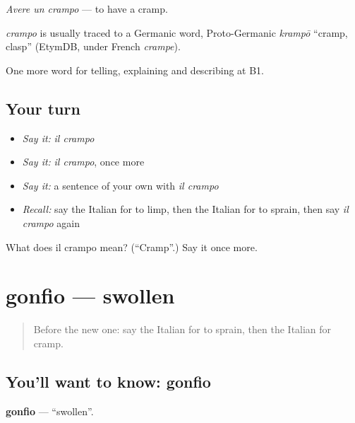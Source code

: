 \emph{Avere un crampo} — to have a cramp.

\begin{cousinweb}
\emph{crampo} is usually traced to a Germanic word, Proto-Germanic \emph{krampō} \textquotedblleft{}cramp, clasp\textquotedblright{} (EtymDB, under French \emph{crampe}).
\end{cousinweb}

\begin{grammarlens}[title={What you've built}]
One more word for telling, explaining and describing at B1.
\end{grammarlens}

\subsection*{Your turn}
\begin{itemize}
\raggedright
  \item \emph{Say it:} \emph{il crampo}
  \item \emph{Say it:} \emph{il crampo}, once more
  \item \emph{Say it:} a sentence of your own with \emph{il crampo}
  \item \emph{Recall:} say the Italian for to limp, then the Italian for to sprain, then say \emph{il crampo} again
\end{itemize}

\begin{tcolorbox}[breakable,colback=teal!4,colframe=teal!35!black,title={Before you move on}]
What does il crampo mean? (\textquotedblleft{}Cramp\textquotedblright{}.) Say it once more.
\end{tcolorbox}
\section[gonfio]{gonfio — swollen}

\label{lesson:IT-C485-gonfio}



\begin{quote}
Before the new one: say the Italian for to sprain, then the Italian for cramp.
\end{quote}

\subsection*{You'll want to know: gonfio}
\textbf{gonfio} — \textquotedblleft{}swollen\textquotedblright{}.

